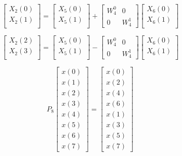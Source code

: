 \documentclass[journal,12pt,twocolumn]{IEEEtran}
\renewcommand\thesection{\arabic{section}}
\begin{document}
\begin{enumerate}[label=\thesection.\arabic*]
\begin{equation}
\begin{bmatrix}
X_{2}(0) \\ 
X_{2}(1)\\ 
\end{bmatrix}
=
\begin{bmatrix}
X_{5}(0) \\ 
X_{5}(1)\\ 
\end{bmatrix}
+
\begin{bmatrix}
W^{0}_{4} & 0\\
0 & W^{1}_{4}
\end{bmatrix}
\begin{bmatrix}
X_{6}(0) \\ 
X_{6}(1) \\ 
\end{bmatrix}
\end{equation}

\begin{equation}
\begin{bmatrix}
X_{2}(2) \\ 
X_{2}(3)\\ 
\end{bmatrix}
=
\begin{bmatrix}
X_{5}(0) \\ 
X_{5}(1)\\ 
\end{bmatrix}
-
\begin{bmatrix}
W^{0}_{4} & 0\\
0 & W^{1}_{4}
\end{bmatrix}
\begin{bmatrix}
X_{6}(0) \\ 
X_{6}(1) \\ 
\end{bmatrix}
\end{equation}

\begin{equation}
P_{8}
\begin{bmatrix}
x(0) \\ 
x(1) \\ 
x(2) \\ 
x(3) \\ 
x(4) \\ 
x(5) \\
x(6) \\
x(7)
\end{bmatrix}
 = 
\begin{bmatrix}
x(0) \\ 
x(2) \\ 
x(4) \\ 
x(6) \\
x(1) \\ 
x(3) \\ 
x(5) \\
x(7)
\end{bmatrix}
\end{equation}


\end{enumerate}
\end{document}
